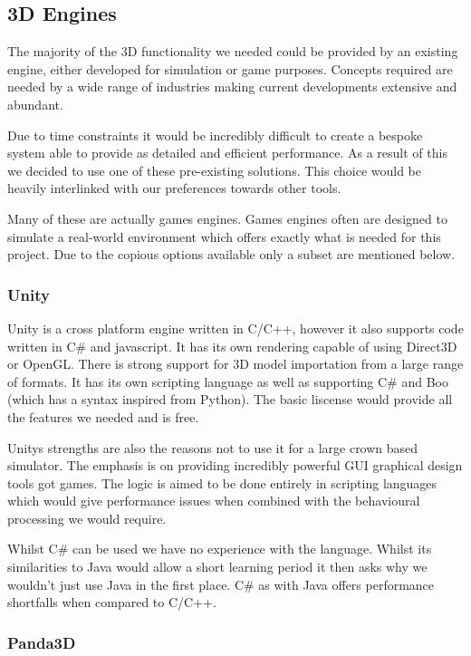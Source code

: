 \subsection*{3D Engines}

The majority of the 3D functionality we needed could be provided by
an existing engine, either developed for simulation or game purposes.
Concepts required are needed by a wide range of industries making
current developments extensive and abundant.

Due to time constraints it would be incredibly difficult to create
a bespoke system able to provide as detailed and efficient performance.
As a result of this we decided to use one of these pre-existing solutions.
This choice would be heavily interlinked with our preferences towards
other tools.

Many of these are actually games engines. Games engines often are
designed to simulate a real-world environment which offers exactly
what is needed for this project. Due to the copious options available
only a subset are mentioned below.


\subsubsection*{Unity }

Unity is a cross platform engine written in C/C++, however it also
supports code written in C\# and javascript. It has its own rendering
capable of using Direct3D or OpenGL. There is strong support for 3D
model importation from a large range of formats. It has its own scripting
language as well as supporting C\# and Boo (which has a syntax inspired
from Python). The basic liscense would provide all the features we
needed and is free.

Unitys strengths are also the reasons not to use it for a large crown
based simulator. The emphasis is on providing incredibly powerful
GUI graphical design tools got games. The logic is aimed to be done
entirely in scripting languages which would give performance issues
when combined with the behavioural processing we would require.

Whilst C\# can be used we have no experience with the language. Whilst
its similarities to Java would allow a short learning period it then
asks why we wouldn't just use Java in the first place. C\# as with
Java offers performance shortfalls when compared to C/C++.


\subsubsection*{Panda3D}


